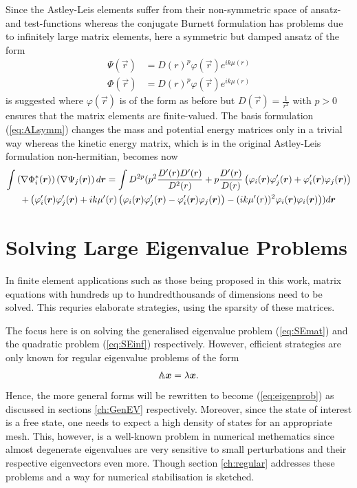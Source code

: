 Since the Astley-Leis elements suffer from their non-symmetric space of ansatz- and test-functions whereas the conjugate Burnett formulation has problems due to infinitely large matrix elements, here a symmetric but damped ansatz of the form
\begin{align} \label{eq:ALsymm}
\Psi(\vec{r}) &= D(r)^p\varphi(\vec{r}) e^{ik\mu(r)} \\
\Phi(\vec{r}) &= D(r)^p\varphi(\vec{r}) e^{ik\mu(r)}
\end{align}
is suggested where $\varphi(\vec{r})$ is of the form as before but $D(\vec{r})=\frac{1}{r^2}$ with $p>0$ ensures that the matrix elements are finite-valued.
The basis formulation (\ref{eq:ALsymm}) changes the mass and potential energy matrices only in a trivial way whereas the kinetic energy matrix, which is in the original Astley-Leis formulation non-hermitian, becomes now
\begin{multline}
\int \left(\nabla \Phi^*_i(\vec{r})\right) \left(\nabla \Psi_j(\vec{r})\right) d\vec{r}=
\int D^{2p}\large(
p^2 \frac{D'(r) D'(r)}{D^2(r)} +p \frac{D'(r)}{D(r)} \left(\varphi_i(\vec{r})\varphi'_j(\vec{r})+ \varphi'_i(\vec{r})\varphi_j(\vec{r}) \right)\\
+ \left(  \varphi'_i(\vec{r})\varphi'_j(\vec{r}) + ik\mu'(r) \left(\varphi_i(\vec{r})\varphi'_j(\vec{r})- \varphi'_i(\vec{r})\varphi_j(\vec{r})  \right) -(ik\mu'(r))^2 \varphi_i(\vec{r})\varphi_i(\vec{r}) \right)
\large)d\vec{r}  
\end{multline}

\section{Solving Large Eigenvalue Problems}
In finite element applications such as those being proposed in this work, matrix equations with hundreds up to hundredthousands of dimensions need to be solved.
This requries elaborate strategies, using the sparsity of these matrices.

The focus here is on solving the generalised eigenvalue problem (\ref{eq:SEmat}) and the quadratic problem (\ref{eq:SEinf}) respectively.
However, efficient strategies are only known for regular eigenvalue problems of the form 
\begin{equation} \label{eq:eigenprob}
\mat{A}\vec{x}=\lambda\vec{x}.
\end{equation}
Hence, the more general forms will be rewritten to become (\ref{eq:eigenprob}) as discussed in sections \ref{ch:GenEV} respectively.
Moreover, since the state of interest is a free state, one needs to expect a high density of states for an appropriate mesh. 
This, however, is a well-known problem in numerical methematics since almost degenerate eigenvalues are very sensitive to small perturbations and their respective eigenvectors even more.
Though section \ref{ch:regular} addresses these problems and a way for numerical stabilisation is sketched.

